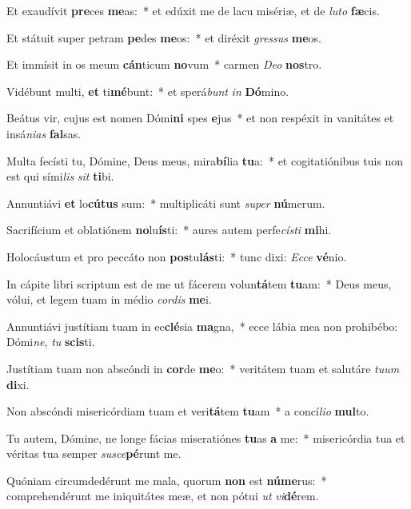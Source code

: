 \item Et exaudívit \textbf{pre}ces \textbf{me}as:~* et edúxit me de lacu misériæ, et de \textit{lu}\textit{to} \textbf{fæ}cis.
\item Et státuit super petram \textbf{pe}des \textbf{me}os:~* et diréxit \textit{gres}\textit{sus} \textbf{me}os.
\item Et immísit in os meum \textbf{cán}ticum \textbf{no}vum~* carmen \textit{De}\textit{o} \textbf{nos}tro.
\item Vidébunt multi, \textbf{et} ti\textbf{mé}bunt:~* et sperá\textit{bunt} \textit{in} \textbf{Dó}mino.
\item Beátus vir, cujus est nomen Dómi\textbf{ni} spes \textbf{e}jus~* et non respéxit in vanitátes et insá\textit{ni}\textit{as} \textbf{fal}sas.
\item Multa fecísti tu, Dómine, Deus meus, mira\textbf{bí}lia \textbf{tu}a:~* et cogitatiónibus tuis non est qui sími\textit{lis} \textit{sit} \textbf{ti}bi.
\item Annuntiávi \textbf{et} lo\textbf{cú}\textbf{tus} sum:~* multiplicáti sunt \textit{su}\textit{per} \textbf{nú}merum.
\item Sacrifícium et oblatiónem \textbf{no}lu\textbf{ís}ti:~* aures autem perfe\textit{cís}\textit{ti} \textbf{mi}hi.
\item Holocáustum et pro peccáto non \textbf{pos}tu\textbf{lás}ti:~* tunc dixi: \textit{Ec}\textit{ce} \textbf{vé}nio.
\item In cápite libri scriptum est de me ut fácerem volun\textbf{tá}tem \textbf{tu}am:~* Deus meus, vólui, et legem tuam in médio \textit{cor}\textit{dis} \textbf{me}i.
\item Annuntiávi justítiam tuam in ec\textbf{clé}sia \textbf{ma}gna,~* ecce lábia mea non prohibébo: Dómi\textit{ne}, \textit{tu} \textbf{scis}ti.
\item Justítiam tuam non abscóndi in \textbf{cor}de \textbf{me}o:~* veritátem tuam et salutáre \textit{tu}\textit{um} \textbf{di}xi.
\item Non abscóndi misericórdiam tuam et veri\textbf{tá}tem \textbf{tu}am~* a concí\textit{li}\textit{o} \textbf{mul}to.
\item Tu autem, Dómine, ne longe fácias miseratiónes \textbf{tu}as \textbf{a} me:~* misericórdia tua et véritas tua semper \textit{su}\textit{sce}\textbf{pé}runt me.
\item Quóniam circumdedérunt me mala, quorum \textbf{non} est \textbf{nú}\textbf{me}rus:~* comprehendérunt me iniquitátes meæ, et non pótui \textit{ut} \textit{vi}\textbf{dé}rem.
